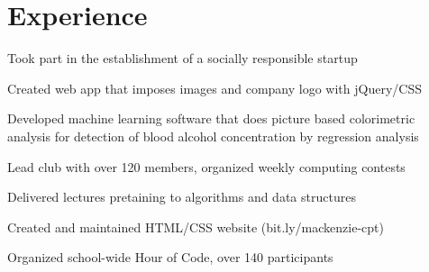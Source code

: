 \documentclass[]{deedy-resume-openfont}
\begin{document}
\begin{minipage}[t]{0.66\textwidth} 


\section{Experience}

\vspace{\topsep}

\vspace{\topsep}
\begin{tightemize}
\item Took part in the establishment of a socially responsible startup
\item Created web app that imposes images and company logo with jQuery/CSS
\item Developed machine learning software that does picture based colorimetric analysis for detection of blood alcohol concentration by regression analysis
\end{tightemize}
\sectionsep

\begin{tightemize}
\item Lead club with over 120 members, organized weekly computing contests
\item Delivered lectures pretaining to algorithms and data structures
\item Created and maintained HTML/CSS website (bit.ly/mackenzie-cpt)
\item Organized school-wide Hour of Code, over 140 participants
\end{tightemize}
\sectionsep



\end{minipage}
\end{document}

